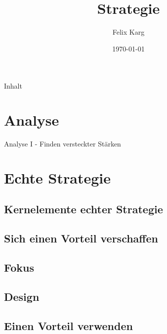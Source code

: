 \documentclass[12pt,compress,ngerman,utf8,t]{beamer}
\date{\today}
\institute{University of Freiburg}
\title{Strategie}
\author{Felix Karg}
\begin{document}
\maketitle


\begin{frame}{Inhalt}
    \small
    \begin{multicols}{2}
        \small
        \tableofcontents[hidesubsections]
    \end{multicols}
    \clearpage
\end{frame}


% 




\section{Analyse}

\begin{frame}{Analyse I - Finden versteckter Stärken}
\end{frame}




\section{Echte Strategie}
\subsection{Kernelemente echter Strategie}
\subsection{Sich einen Vorteil verschaffen}
\subsection{Fokus}
\subsection{Design}
\subsection{Einen Vorteil verwenden}



% 
\end{document}
